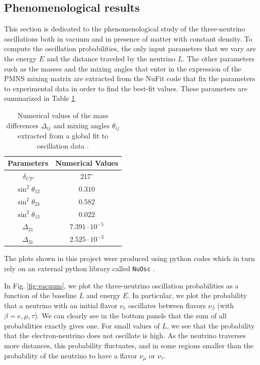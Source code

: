 \documentclass[twocolumn,secnumarabic,amssymb, nobibnotes, aps, prd,10pt]{revtex4-1}
\newcommand{\Fig}[1]{Fig.$\:$\ref{#1}}
\begin{document}
\subsection{Phenomenological results}
\label{subsec:results}

This section is dedicated to the phenomenological study of the three-neutrino oscillations
both in vacuum and in presence of matter with constant density. To compute the oscillation
probabilities, the only input parameters that we vary are the energy $E$ and the distance
traveled by the neutrino $L$. The other parameters such as the masses and the mixing angles
that enter in the expression of the PMNS mixing matrix are extracted from the NuFit code 
that fix the parameters to experimental data in order to find the best-fit values. These
parameters are summarized in Table \ref{tab:params}.
\begin{table}[!ht]
\centering
\begin{tabular}[t]{|c|c|}
\hline
\textbf{Parameters} 		& \textbf{Numerical Values} \\
\hline
$\delta_{CP}$			& $217^{\circ}$  \\
\hline
$\sin^2 \theta_{12}$		& $0.310$ \\
\hline
$\sin^2 \theta_{23}$		& $0.582$ \\
\hline
$\sin^2 \theta_{13}$		& $0.022$ \\
\hline
$\Delta_{21}$			& $7.391 \cdot 10^{-5}$ \\
\hline
$\Delta_{31}$			& $2.525 \cdot 10^{-3}$ \\
\hline
\end{tabular}
\caption{Numerical values of the mass differences $\Delta_{ij}$ and mixing angles
$\theta_{ij}$ extracted from a global fit to oscillation data \cite{Esteban:2018azc, }.}
\label{tab:params}
\end{table}

The plots shown in this project were produced using python codes \cite{} which in turn rely
on an external python library called \texttt{NuOsc} \cite{}.

In \Fig{fig:vacuum}, we plot the three-neutrino oscillation probabilities as a function of
the baseline $L$ and energy $E$. In particular, we plot the probability that a neutrino
with an initial flavor $\nu_e$ oscillates between flavors $\nu_\beta$ (with $\beta = e,
\mu, \tau$). We can clearly see in the bottom panels that the sum of all probabilities
exactly gives one. For small values of $L$, we see that the probability that the 
electron-neutrino does not oscillate is high. As the neutrino traverses more distances,
this probability fluctuates, and in some regions smaller than the probability of the
neutrino to have a flavor $\nu_\mu$ or $\nu_\tau$.
\end{document}
